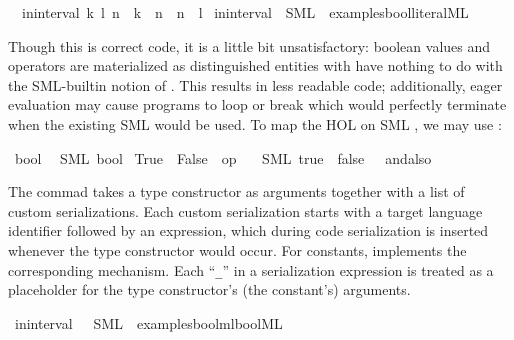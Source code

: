 \begin{isabellebody}
\ \ {\isachardoublequoteopen}in{\isacharunderscore}interval\ {\isacharparenleft}k{\isacharcomma}\ l{\isacharparenright}\ n\ {\isasymlongleftrightarrow}\ k\ {\isasymle}\ n\ {\isasymand}\ n\ {\isasymle}\ l{\isachardoublequoteclose}%
\isadelimtt
%
\endisadelimtt
%
\isatagtt
%
\endisatagtt
{\isafoldtt}%
%
\isadelimtt
%
\endisadelimtt
{}\isamarkupfalse%
\ in{\isacharunderscore}interval\ \ SML\ \ {\isachardoublequoteopen}examples{\isacharslash}bool{\isacharunderscore}literal{\isachardot}ML{\isachardoublequoteclose}%
\begin{isamarkuptext}%

  \noindent Though this is correct code, it is a little bit unsatisfactory:
  boolean values and operators are materialized as distinguished
  entities with have nothing to do with the SML-builtin notion
  of .  This results in less readable code;
  additionally, eager evaluation may cause programs to
  loop or break which would perfectly terminate when
  the existing SML  would be used.  To map
  the HOL  on SML , we may use
  :%
\end{isamarkuptext}%
\isamarkuptrue%
%
\isadelimtt
%
\endisadelimtt
%
\isatagtt
{}\isamarkupfalse%
\ bool\isanewline
\ \ {\isacharparenleft}SML\ {\isachardoublequoteopen}bool{\isachardoublequoteclose}{\isacharparenright}\isanewline
{}\isamarkupfalse%
\ True\ \ False\ \ {\isachardoublequoteopen}op\ {\isasymand}{\isachardoublequoteclose}\isanewline
\ \ {\isacharparenleft}SML\ {\isachardoublequoteopen}true{\isachardoublequoteclose}\ \ {\isachardoublequoteopen}false{\isachardoublequoteclose}\ \ {\isachardoublequoteopen}{\isacharunderscore}\ andalso\ {\isacharunderscore}{\isachardoublequoteclose}{\isacharparenright}%
\endisatagtt
{\isafoldtt}%
%
\isadelimtt
%
\endisadelimtt
%
\begin{isamarkuptext}%
The \isa{{\isasymCODETYPE}} commad takes a type constructor
  as arguments together with a list of custom serializations.
  Each custom serialization starts with a target language
  identifier followed by an expression, which during
  code serialization is inserted whenever the type constructor
  would occur.  For constants, \isa{{\isasymCODECONST}} implements
  the corresponding mechanism.  Each ``\verb|_|'' in
  a serialization expression is treated as a placeholder
  for the type constructor's (the constant's) arguments.%
\end{isamarkuptext}%
\isamarkuptrue%
\isamarkupfalse%
\ in{\isacharunderscore}interval\ \ \ SML\ \ {\isachardoublequoteopen}examples{\isacharslash}bool{\isacharunderscore}mlbool{\isachardot}ML{\isachardoublequoteclose}%
\begin{isamarkuptext}%


\end{isamarkuptext}
\end{isabellebody}
